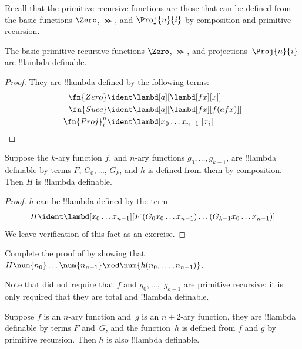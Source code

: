 \documentclass[../../../include/open-logic-section]{subfiles}
\begin{document}

Recall that the primitive recursive functions are those that can be
defined from the basic functions $\Zero$, $\Succ$, and $\Proj{n}{i}$
by composition and primitive recursion.

\begin{lem}
  The basic primitive recursive functions $\Zero$, $\Succ$, and
  projections~$\Proj{n}{i}$ are !!{lambda definable}.
\end{lem}

\begin{proof}
They are !!{lambda define}d by the following terms:
\begin{align*}
  \fn{Zero} & \ident \lambd[a][\lambd[fx][x]]\\
  \fn{Succ} & \ident \lambd[a][\lambd[fx][f (a f x)]] \\
  \fn{Proj}^n_i & \ident \lambd[x_0\dots x_{n-1}][x_i]
\end{align*}
\end{proof}

\begin{lem}
   Suppose the $k$-ary function $f$, and $n$-ary
  functions $g_0, \dots, g_{k-1}$, are !!{lambda definable} by terms
  $F$, $G_0$, \dots, $G_k$, and $h$ is defined from them by composition.
  Then $H$ is !!{lambda definable}.
\end{lem}

\begin{proof}
  $h$ can be !!{lambda define}d by the term
  \[
  H \ident \lambd[x_0 \dots x_{n-1}][F\, (G_0 x_0 \dots
    x_{n-1}) \dots (G_{k-1} x_0 \dots x_{n-1})]
  \]
  We leave verification of this fact as an exercise.
\end{proof}

\begin{prob}
  Complete the proof of  by showing
  that $H\num{n_0}\dots\num{n_{n-1}} \red \num{h(n_0, \dots,
    n_{n-1})}$.
\end{prob}

Note that  did not require that $f$ and $g_0$,
\dots,~$g_{k-1}$ are primitive recursive; it is only required that
they are total and !!{lambda definable}.

\begin{lem}
  Suppose $f$ is an $n$-ary function and~$g$ is an $n+2$-ary function,
  they are !!{lambda definable} by terms $F$ and~$G$, and the
  function~$h$ is defined from $f$ and $g$ by primitive
  recursion. Then $h$ is also !!{lambda definable}.
\end{lem}
\end{document}
